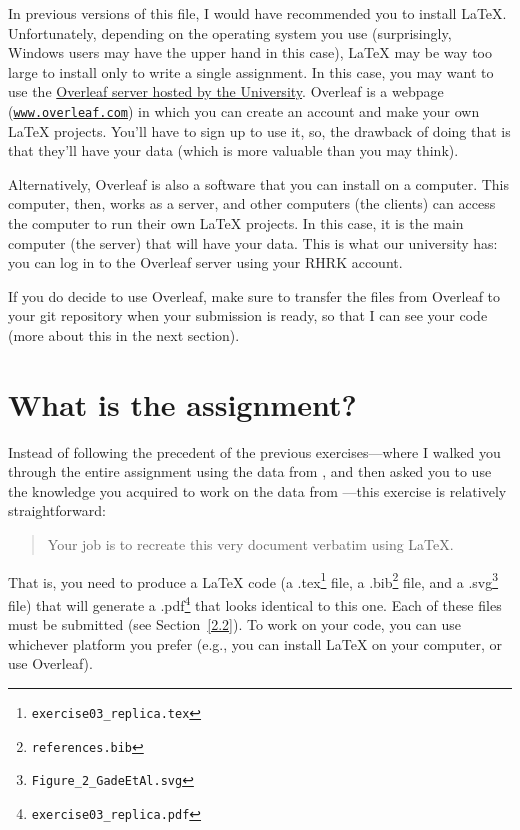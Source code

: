 \documentclass[11pt,a4paper]{scrartcl}
\begin{document}
In previous versions of this file, I would have recommended you to install LaTeX.
Unfortunately, depending on the operating system you use (surprisingly, Windows users
may have the upper hand in this case), LaTeX may be way too large to install only to
write a single assignment. In this case, you may want to use the \href{https://sharelatex.rz.rptu.de}{Overleaf server hosted by the University}.
 Overleaf is a webpage (\href{https://www.overleaf.com}{\texttt{www.overleaf.com}}) in
which you can create an account and make your own LaTeX projects. You’ll have to sign up to use it, so, the drawback of doing that is that they’ll have your data (which is more valuable than you may think). 

Alternatively, Overleaf is also a software that you can install on a computer. This
computer, then, works as a server, and other computers (the clients) can access the
computer to run their own LaTeX projects. In this case, it is the main computer (the
server) that will have your data. This is what our university has: you can log in to the
Overleaf server using your RHRK account.

If you do decide to use Overleaf, make sure to transfer the files from Overleaf to your
git repository when your submission is ready, so that I can see your code (more about
this in the next section).

\section{What is the assignment?}
Instead of following the precedent of the previous exercises—where I walked you through
the entire assignment using the data from \textcite{gade2021}, and then asked you to use
the knowledge you acquired to work on the data from \textcite{gosselin2024}—this
exercise is relatively straightforward:

\begin{quote}
Your job is to recreate this very document verbatim using LaTeX.
\end{quote}


That is, you need to produce a LaTeX code (a .tex\footnote{\texttt{exercise03\_replica.tex}} file,  
a .bib\footnote{\texttt{references.bib}} file, and a .svg\footnote{\texttt{Figure\_2\_GadeEtAl.svg}} file)  
that will generate a .pdf\footnote{\texttt{exercise03\_replica.pdf}} that looks identical to this one. Each of these files must be submitted (see Section~\ref{2.2}). To work on your code, you can use whichever platform you prefer (e.g., you can install LaTeX on your computer, or use Overleaf).
\end{document}
